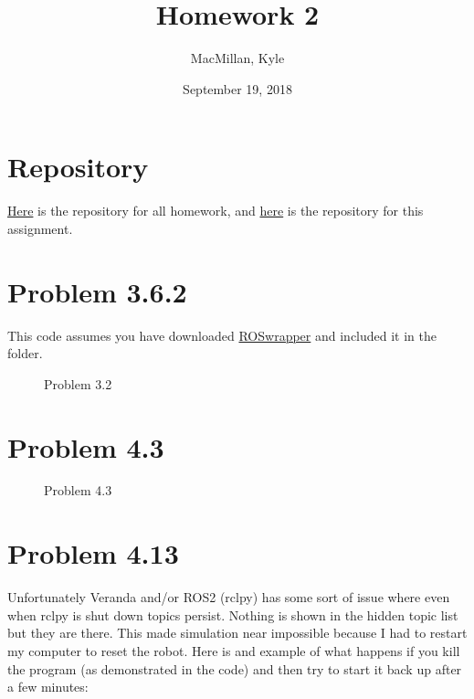 \documentclass{article}
\title{\textbf{Homework 2}}
\author{MacMillan, Kyle}
\date{September 19, 2018}
\begin{document}
\maketitle

\newpage
\tableofcontents
{}




\newpage
\hypersetup{
    colorlinks,
    citecolor=blue,
    filecolor=black,
    linkcolor=blue,
    urlcolor=blue
}

\setcounter{page}{1}
\section{\textbf{Repository}}
\href{https://github.com/macattackftw/RoboticsHW}{Here} is the repository for all homework, and \href{https://github.com/macattackftw/RoboticsHW/tree/master/HW2}{here} is the repository for this assignment.

\newpage
\section{\textbf{Problem 3.6.2}}
This code assumes you have downloaded \href{https://github.com/macattackftw/ROSwrapper}{ROSwrapper} and included it in the folder.


\newpage
\begin{figure}[htbp]
  \centering
  
  \caption{Problem 3.2}
\end{figure}


\newpage
\section{\textbf{Problem 4.3}}


\newpage
\begin{figure}[htbp]
  \centering
  
  \caption{Problem 4.3}
\end{figure}


\newpage
\section{\textbf{Problem 4.13}}

Unfortunately Veranda and/or ROS2 (rclpy) has some sort of issue where even when rclpy is shut down topics persist. Nothing is shown in the hidden topic list but they are there. This made simulation near impossible because I had to restart my computer to reset the robot. Here is and example of what happens if you kill the program (as demonstrated in the code) and then try to start it back up after a few minutes:
\end{document}
